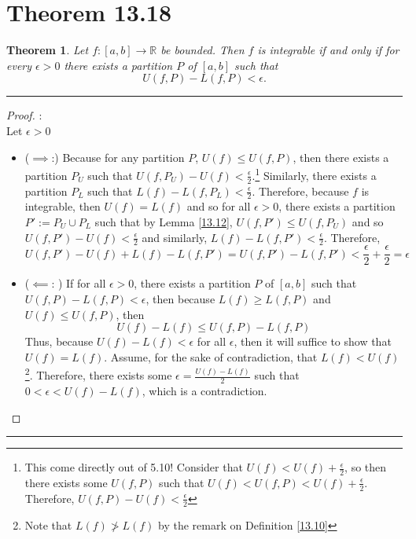 \documentclass[openany, amssymb, psamsfonts]{amsart}
\newcommand{\bbR}{\mathbb{R}}
\newtheorem{thm}{Theorem}[section]
\theoremstyle{definition}
\numberwithin{equation}{section}
\begin{document}
\section*{Theorem 13.18}
\begin{thm} 
	\label{13.18}
	Let $f\colon [a, b] \to \bbR$ be bounded. Then $f$ is integrable if and only if for every $\epsilon > 0$ there exists a partition $P$ of $[a, b]$ such that
	\[
		U(f, P) - L(f, P) < \epsilon.
	\]
\end{thm}
\vspace{4pt}     \hrule   \vspace{4pt}\begin{proof}:\\
Let $\epsilon>0$
\begin{itemize}
    \item ($\implies$:) Because for any partition $P$, $U(f)\leq U(f,P)$, then there exists a partition $P_U$ such that $U(f,P_U)-U(f)< \frac{\epsilon}{2}.$\footnote{This come directly out of 5.10! Consider that $U(f)< U(f) + \frac{\epsilon}{2}$, so then there exists some $U(f,P)$ such that $U(f)< U(f,P)< U(f) + \frac{\epsilon}{2}.$ Therefore, $ U(f,P) -U(f)< \frac{\epsilon}{2}$} Similarly, there exists a partition $P_L$ such that  $L(f) - L(f,P_L)< \frac{\epsilon}{2}.$ Therefore, because $f$ is integrable, then $U(f) = L(f)$ and so for all $\epsilon>0$, there exists a partition $P':=P_U \cup P_L$ such that by Lemma \ref{13.12}, $U(f,P')\leq U(f,P_U)$ and so $U(f,P')-U(f)< \frac{\epsilon}{2}$ and similarly, $L(f) - L(f,P')< \frac{\epsilon}{2}.$ Therefore, \[U(f,P')-U(f) + L(f) - L(f,P') = U(f,P') - L(f,P') < \frac{\epsilon}{2} + \frac{\epsilon}{2} = \epsilon\]
    \item ($\impliedby$: ) If for all $\epsilon>0$, there exists a partition $P$ of $[a,b]$ such that $U(f,P) - L(f,P)< \epsilon$, then because $L(f) \geq L(f,P)$ and $U(f)\leq U(f,P)$, then \[U(f) - L(f) \leq U(f,P) - L(f,P)\]
    Thus, because $U(f) - L(f)<\epsilon$ for all $\epsilon$, then it will suffice to show that $U(f) = L(f)$. Assume, for the sake of contradiction, that $L(f)< U(f)$\footnote{Note that $L(f)\not> L(f)$ by the remark on Definition \ref{13.10}}. Therefore, there exists some $\epsilon = \frac{U(f) - L(f)}{2}$ such that $0 < \epsilon < U(f) - L(f)$, which is a contradiction.
\end{itemize}

\end{proof}\vspace{4pt}     \hrule   \vspace{4pt}
\end{document}
